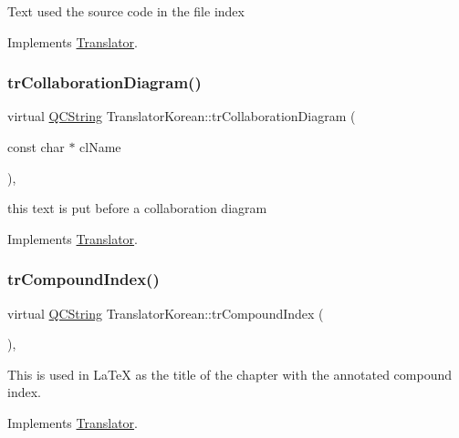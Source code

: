 Text used the source code in the file index 

Implements \mbox{\hyperlink{class_translator}{Translator}}.

\mbox{\label{class_translator_korean_a92661383e0f3904e197a57a6be8a9fc9}} 
\subsubsection{\texorpdfstring{trCollaborationDiagram()}{trCollaborationDiagram()}}
{\footnotesize\ttfamily virtual \mbox{\hyperlink{class_q_c_string}{Q\+C\+String}} Translator\+Korean\+::tr\+Collaboration\+Diagram (\begin{DoxyParamCaption}\item[{const char $\ast$}]{cl\+Name }\end{DoxyParamCaption})\hspace{0.3cm}{\ttfamily [inline]}, {\ttfamily [virtual]}}

this text is put before a collaboration diagram 

Implements \mbox{\hyperlink{class_translator}{Translator}}.

\mbox{\label{class_translator_korean_a744e09d20edaa2a62c09b46928dc7bb0}} 
\subsubsection{\texorpdfstring{trCompoundIndex()}{trCompoundIndex()}}
{\footnotesize\ttfamily virtual \mbox{\hyperlink{class_q_c_string}{Q\+C\+String}} Translator\+Korean\+::tr\+Compound\+Index (\begin{DoxyParamCaption}{ }\end{DoxyParamCaption})\hspace{0.3cm}{\ttfamily [inline]}, {\ttfamily [virtual]}}

This is used in La\+TeX as the title of the chapter with the annotated compound index. 

Implements \mbox{\hyperlink{class_translator}{Translator}}.

\mbox{\label{class_translator_korean_a8147d72a8b9d61b0bb0518cb7388e307}} 
